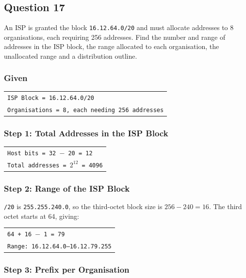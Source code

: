 \documentclass[11pt,a4paper]{article}
\begin{document}
\subsection*{Question 17}

An ISP is granted the block \texttt{16.12.64.0/20} and must allocate addresses to 8
organisations, each requiring 256 addresses. Find the number and range of addresses in the
ISP block, the range allocated to each organisation, the unallocated range and a distribution
outline.

\subsubsection*{Given}

\begin{tabularx}{\textwidth}{@{}X@{}}
\texttt{ISP Block = 16.12.64.0/20} \\
\texttt{Organisations = 8, each needing 256 addresses} \\
\end{tabularx}

\subsubsection*{Step 1: Total Addresses in the ISP Block}

\begin{tabularx}{\textwidth}{@{}X@{}}
\texttt{Host bits = 32 $-$ 20 = 12} \\
\texttt{Total addresses = $2^{12}$ = 4096} \\
\end{tabularx}

\subsubsection*{Step 2: Range of the ISP Block}

\texttt{/20} is \texttt{255.255.240.0}, so the third-octet block size is
$256 - 240 = 16$. The third octet starts at 64, giving:

\begin{tabularx}{\textwidth}{@{}X@{}}
\texttt{64 + 16 $-$ 1 = 79} \\
\texttt{Range: 16.12.64.0--16.12.79.255} \\
\end{tabularx}

\subsubsection*{Step 3: Prefix per Organisation}
\end{document}
